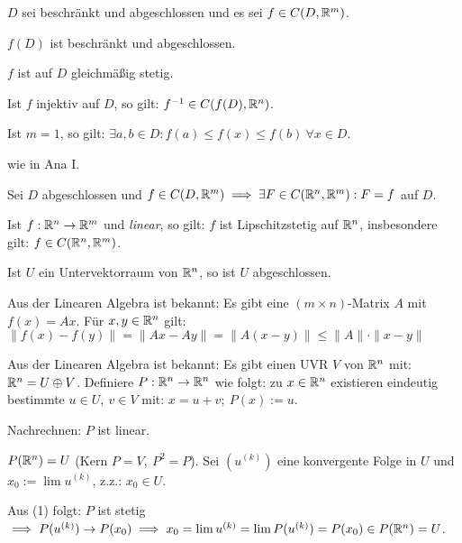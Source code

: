 \documentclass[a4paper,twoside,DIV15,BCOR12mm,chapterprefix=true,headings=twolinechapter]{scrbook}
\begin{document}
\begin{satz}
$D$ sei beschränkt und abgeschlossen und es sei $f \in C(D,\mathbb{R}^m)$.
\begin{liste}
\item $f(D)$ ist beschränkt und abgeschlossen.
\item $f$ ist auf $D$ gleichmäßig stetig.
\item Ist $f$ injektiv auf $D$, so gilt: $f^{-1} \in C(f(D),\mathbb{R}^n)$.
\item Ist $m = 1$, so gilt: $\exists a,b \in D: f(a) \le f(x) \le f(b)\ \forall x \in D$.
\end{liste}
\end{satz}

\begin{beweis}
wie in Ana I.
\end{beweis}

\begin{satz}
Sei $D$ abgeschlossen und $f \in C(D,\mathbb{R}^m) \implies \exists F \in C(\mathbb{R}^n,\mathbb{R}^m): F=f$ auf $D$.
\end{satz}

\begin{satz}
\begin{liste}
\item Ist $f:\mathbb{R}^n \to \mathbb{R}^m$ und \emph{linear}, so gilt: $f$ ist Lipschitzstetig auf $\mathbb{R}^n$, insbesondere gilt: $f \in C(\mathbb{R}^n,\mathbb{R}^m)$.
\item Ist $U$ ein Untervektorraum von $\mathbb{R}^n$, so ist $U$ abgeschlossen.
\end{liste}
\end{satz}

\begin{beweise}
\item Aus der Linearen Algebra ist bekannt: Es gibt eine $(m \times n)$-Matrix $A$ mit $f(x) = Ax$. Für $x,y \in \mathbb{R}^n$ gilt: $\|f(x)-f(y)\| = \|Ax - Ay\| = \|A(x-y)\| \le \|A\|\cdot \|x-y\|$

\item Aus der Linearen Algebra ist bekannt: Es gibt einen UVR $V$ von $\mathbb{R}^n$ mit: $\mathbb{R}^n = U \oplus V$. Definiere $P: \mathbb{R}^n \to \mathbb{R}^n$ wie folgt: zu $x \in \mathbb{R}^n$ existieren eindeutig bestimmte $u \in U,\ v \in V$ mit: $x = u+v;\ P(x) := u$.

Nachrechnen: $P$ ist linear.

$P(\mathbb{R}^n) = U$ (Kern $P = V,\ P^2 = P$). Sei $(u^{(k)})$ eine konvergente Folge in $U$ und $x_0 := \lim u^{(k)}$, z.z.: $x_0 \in U$.

Aus (1) folgt: $P$ ist stetig $\implies P(u^{(k)}) \to P(x_0) \implies x_0 = \lim u^{(k)} = \lim P(u^{(k)}) = P(x_0) \in P(\mathbb{R}^n) = U$.
\end{beweise}
\end{document}
